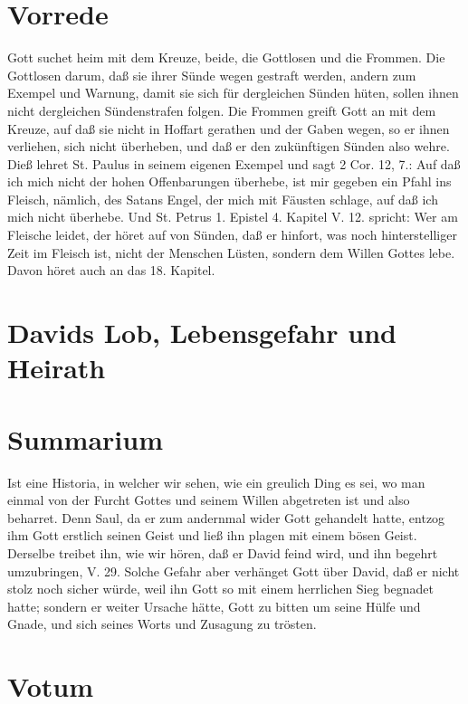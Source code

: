 \section{Vorrede}

Gott suchet heim mit dem Kreuze, beide, die Gottlosen und die Frommen. Die Gottlosen darum, daß sie ihrer Sünde wegen gestraft werden, andern zum Exempel und Warnung, damit sie sich für dergleichen Sünden hüten, sollen ihnen nicht dergleichen Sündenstrafen folgen. Die Frommen greift Gott an mit dem Kreuze, auf daß sie nicht in Hoffart gerathen und der Gaben wegen, so er ihnen verliehen, sich nicht überheben, und daß er den zukünftigen Sünden also wehre. Dieß lehret St. Paulus in seinem eigenen Exempel und sagt 2 Cor. 12, 7.: Auf daß ich mich nicht der hohen Offenbarungen überhebe, ist mir gegeben ein Pfahl ins Fleisch, nämlich, des Satans Engel, der mich mit Fäusten schlage, auf daß ich mich nicht überhebe. Und St. Petrus 1. Epistel 4. Kapitel V. 12. spricht: Wer am Fleische leidet, der höret auf von Sünden, daß er hinfort, was noch hinterstelliger Zeit im Fleisch ist, nicht der Menschen Lüsten, sondern dem Willen Gottes lebe. Davon höret auch an das 18. Kapitel.

\section{Davids Lob, Lebensgefahr und Heirath}

\section{Summarium}

Ist eine Historia, in welcher wir sehen, wie ein greulich Ding es sei, wo man einmal von der Furcht Gottes und seinem Willen abgetreten ist und also beharret. Denn Saul, da er zum andernmal wider Gott gehandelt hatte, entzog ihm Gott erstlich seinen Geist und ließ ihn plagen mit einem bösen Geist. Derselbe treibet ihn, wie wir hören, daß er David feind wird, und ihn begehrt umzubringen, V. 29. Solche Gefahr aber verhänget Gott über David, daß er nicht stolz noch sicher würde, weil ihn Gott so mit einem herrlichen Sieg begnadet hatte; sondern er weiter Ursache hätte, Gott zu bitten um seine Hülfe und Gnade, und sich seines Worts und Zusagung zu trösten.

\section{Votum}

